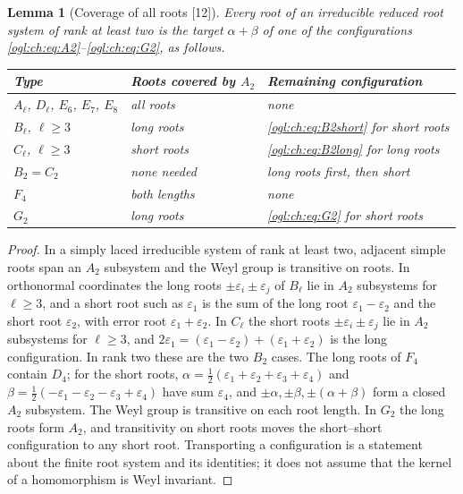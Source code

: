 \documentclass[11pt,oneside]{article}
\numberwithin{equation}{section}
\newtheorem{lemma}[lemma]{Lemma}
\theoremstyle{definition}
\theoremstyle{remark}
\newcommand{\src}[1]{\textup{\textsf{\small[#1]}}}
\begin{document}
\begin{lemma}[Coverage of all roots \src{12}]\label{ogl:ch:lem:coverage}
Every root of an irreducible reduced root system of rank at least two is the
target $\alpha+\beta$ of one of the configurations
\eqref{ogl:ch:eq:A2}--\eqref{ogl:ch:eq:G2}, as follows.
\begin{center}
\renewcommand{\arraystretch}{1.1}
\begin{tabular}{lll}
\toprule
Type & Roots covered by $A_2$ & Remaining configuration\\
\midrule
$A_\ell$, $D_\ell$, $E_6$, $E_7$, $E_8$ & all roots & none\\
$B_\ell$, $\ell\ge3$ & long roots & \eqref{ogl:ch:eq:B2short} for short roots\\
$C_\ell$, $\ell\ge3$ & short roots & \eqref{ogl:ch:eq:B2long} for long roots\\
$B_2=C_2$ & none needed & long roots first, then short\\
$F_4$ & both lengths & none\\
$G_2$ & long roots & \eqref{ogl:ch:eq:G2} for short roots\\
\bottomrule
\end{tabular}
\end{center}
\end{lemma}
\begin{proof}
In a simply laced irreducible system of rank at least two, adjacent simple roots
span an $A_2$ subsystem and the Weyl group is transitive on roots. In orthonormal
coordinates the long roots $\pm\varepsilon_i\pm\varepsilon_j$ of $B_\ell$ lie in $A_2$
subsystems for $\ell\ge3$, and a short root such as $\varepsilon_1$ is the sum of
the long root $\varepsilon_1-\varepsilon_2$ and the short root $\varepsilon_2$,
with error root $\varepsilon_1+\varepsilon_2$. In $C_\ell$ the short roots
$\pm\varepsilon_i\pm\varepsilon_j$ lie in $A_2$ subsystems for $\ell\ge3$, and
$2\varepsilon_1=(\varepsilon_1-\varepsilon_2)+(\varepsilon_1+\varepsilon_2)$
is the long configuration. In rank two these are the two $B_2$ cases. The long
roots of $F_4$ contain $D_4$; for the short roots,
$\alpha=\frac12(\varepsilon_1+\varepsilon_2+\varepsilon_3+\varepsilon_4)$ and
$\beta=\frac12(-\varepsilon_1-\varepsilon_2-\varepsilon_3+\varepsilon_4)$ have sum
$\varepsilon_4$, and $\pm\alpha,\pm\beta,\pm(\alpha+\beta)$ form a closed $A_2$
subsystem. The Weyl group is transitive on each root length. In $G_2$ the long
roots form $A_2$, and transitivity on short roots moves the short--short
configuration to any short root. Transporting a configuration is a statement
about the finite root system and its identities; it does not assume that the
kernel of a homomorphism is Weyl invariant.
\end{proof}
\end{document}
